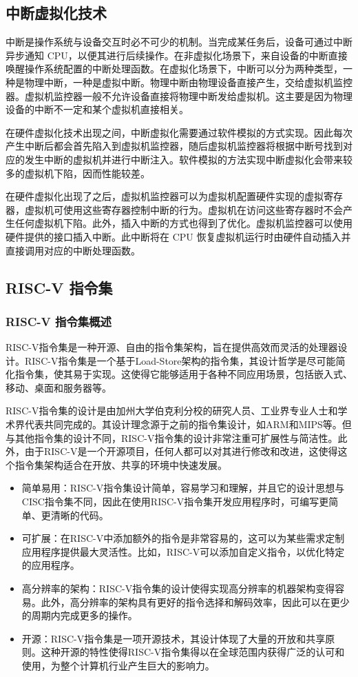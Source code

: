 \subsection{中断虚拟化技术}
中断是操作系统与设备交互时必不可少的机制。当完成某任务后，设备可通过中断异步通知 CPU，以便其进行后续操作。在非虚拟化场景下，来自设备的中断直接唤醒操作系统配置的中断处理函数。在虚拟化场景下，中断可以分为两种类型，一种是物理中断，一种是虚拟中断。物理中断由物理设备直接产生，交给虚拟机监控器。虚拟机监控器一般不允许设备直接将物理中断发给虚拟机。这主要是因为物理设备的中断不一定和某个虚拟机直接相关。\cite{陈海波2019现代操作系统}

在硬件虚拟化技术出现之间，中断虚拟化需要通过软件模拟的方式实现。因此每次产生中断后都会首先陷入到虚拟机监控器，随后虚拟机监控器将根据中断号找到对应的发生中断的虚拟机并进行中断注入。软件模拟的方法实现中断虚拟化会带来较多的虚拟机下陷，因而性能较差。\cite{陈海波2019现代操作系统}

在硬件虚拟化出现了之后，虚拟机监控器可以为虚拟机配置硬件实现的虚拟寄存器，虚拟机可使用这些寄存器控制中断的行为。虚拟机在访问这些寄存器时不会产生任何虚拟机下陷。此外，插入中断的方式也得到了优化。虚拟机监控器可以使用硬件提供的接口插入中断。此中断将在 CPU 恢复虚拟机运行时由硬件自动插入并直接调用对应的中断处理函数。\cite{陈海波2019现代操作系统}

\subsection{RISC-V 指令集}

\subsubsection{RISC-V 指令集概述}
RISC-V指令集是一种开源、自由的指令集架构，旨在提供高效而灵活的处理器设计。RISC-V指令集是一个基于Load-Store架构的指令集，其设计哲学是尽可能简化指令集，使其易于实现。这使得它能够适用于各种不同应用场景，包括嵌入式、移动、桌面和服务器等。

RISC-V指令集的设计是由加州大学伯克利分校的研究人员、工业界专业人士和学术界代表共同完成的。其设计理念源于之前的指令集设计，如ARM和MIPS等。但与其他指令集的设计不同，RISC-V指令集的设计非常注重可扩展性与简洁性。此外，由于RISC-V是一个开源项目，任何人都可以对其进行修改和改进，这使得这个指令集架构适合在开放、共享的环境中快速发展。

\begin{itemize}
    \item 简单易用：RISC-V指令集设计简单，容易学习和理解，并且它的设计思想与CISC指令集不同，因此在使用RISC-V指令集开发应用程序时，可编写更简单、更清晰的代码。
    \item 可扩展：在RISC-V中添加额外的指令是非常容易的，这可以为某些需求定制应用程序提供最大灵活性。比如，RISC-V可以添加自定义指令，以优化特定的应用程序。
    \item 高分辨率的架构：RISC-V指令集的设计使得实现高分辨率的机器架构变得容易。此外，高分辨率的架构具有更好的指令选择和解码效率，因此可以在更少的周期内完成更多的操作。
    \item 开源：RISC-V指令集是一项开源技术，其设计体现了大量的开放和共享原则。这种开源的特性使得RISC-V指令集得以在全球范围内获得广泛的认可和使用，为整个计算机行业产生巨大的影响力。
\end{itemize}

